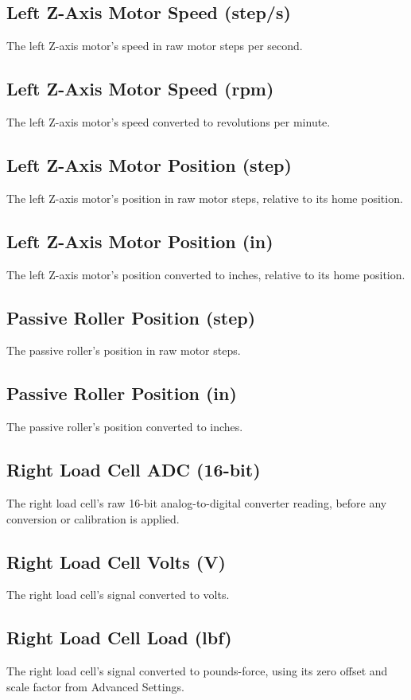 \documentclass[12pt]{report}
\begin{document}
\subsection{Left Z-Axis Motor Speed (step/s)}
The left Z-axis motor's speed in raw motor steps per second.

\subsection{Left Z-Axis Motor Speed (rpm)}
The left Z-axis motor's speed converted to revolutions per minute.

\subsection{Left Z-Axis Motor Position (step)}
The left Z-axis motor's position in raw motor steps, relative to its home position.

\subsection{Left Z-Axis Motor Position (in)}
The left Z-axis motor's position converted to inches, relative to its home position.

\subsection{Passive Roller Position (step)}
The passive roller's position in raw motor steps.

\subsection{Passive Roller Position (in)}
The passive roller's position converted to inches.

\subsection{Right Load Cell ADC (16-bit)}
The right load cell's raw 16-bit analog-to-digital converter reading, before any conversion or calibration is applied.

\subsection{Right Load Cell Volts (V)}
The right load cell's signal converted to volts.

\subsection{Right Load Cell Load (lbf)}
The right load cell's signal converted to pounds-force, using its zero offset and scale factor from Advanced Settings.
\end{document}

